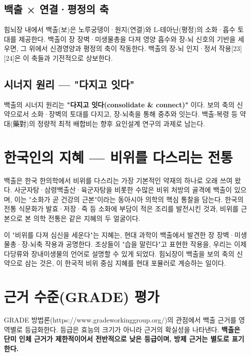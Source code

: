 \documentclass[11pt,oneside]{book}
\begin{document}
\subsection{백출 × 연결·평정의 축}
힘뇌장 내에서 백출(보)은 노루궁뎅이·원지(연결)와 L-테아닌(평정)의 소화·흡수 토대를 제공한다. 백출이 장 장벽·미생물총을 다져 영양 흡수와 장-뇌 신호의 기반을 세우면, 그 위에서 신경영양과 평정의 축이 작동한다. 백출의 장-뇌 인지·정서 작용[23][24]은 이 축들과 기전적으로 상보한다.

\subsection{시너지 원리 — "다지고 잇다"}
백출의 시너지 원리는 \textbf{"다지고 잇다(consolidate \& connect)"} 이다. 보의 축의 신약으로서 소화·장벽의 토대를 다지고, 장-뇌축을 통해 중추와 잇는다. 백출-복령 등 약대(藥對)의 정량적 최적 배합비는 향후 요인설계 연구의 과제로 남는다.

\section{한국인의 지혜 — 비위를 다스리는 전통}
백출은 한국 한의학에서 비위를 다스리는 가장 기본적인 약재의 하나로 오래 쓰여 왔다. 사군자탕·삼령백출산·육군자탕을 비롯한 수많은 비위 처방의 골격에 백출이 있으며, 이는 "소화가 곧 건강의 근본"이라는 동아시아 의학의 핵심 통찰을 담는다. 한국의 전통 식문화가 발효·저장·죽 등 소화에 부담이 적은 조리를 발전시킨 것과, 비위를 근본으로 본 의학 전통은 같은 지혜의 두 얼굴이다.

이 "비위를 다져 심신을 세운다"는 지혜는, 현대 과학이 백출에서 발견한 장 장벽·미생물총·장-뇌축 작용과 공명한다. 조상들이 "습을 말린다"고 표현한 작용을, 우리는 이제 다당류와 장내미생물의 언어로 설명할 수 있게 되었다. 힘뇌장이 백출을 보의 축의 신약으로 삼는 것은, 이 한국적 비위 중심 지혜를 현대 포뮬러로 계승하는 일이다.

\section{근거 수준(GRADE) 평가}
GRADE 방법론(https://www.gradeworkinggroup.org/)의 관점에서 백출 근거를 영역별로 등급화한다. 등급은 효능의 크기가 아니라 근거의 확실성을 나타낸다. \textbf{백출은 단미 인체 근거가 제한적이어서 전반적으로 낮은 등급이며, 방제 근거는 별도로 표기한다.}
\end{document}
